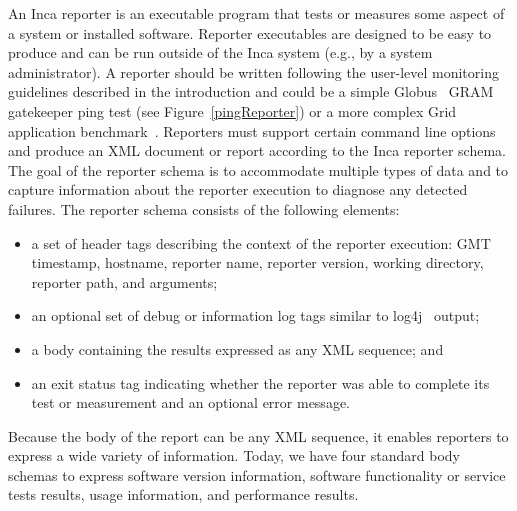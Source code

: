 \documentclass[times,10pt,twocolumn]{article}
\begin{document}
An Inca reporter is an executable program that tests or measures some aspect
of a system or installed software.   Reporter executables are designed to be
easy to produce and can be run outside of the Inca system (e.g., by a system
administrator).  A reporter should be written following the user-level
monitoring guidelines described in the introduction and could be a simple
Globus~\cite{globus} GRAM gatekeeper ping test (see Figure~\ref{pingReporter})
or a more complex Grid application benchmark~\cite{grasp}.  Reporters must
support certain command line options and produce an XML document or report
according to the Inca reporter schema.  The goal of the reporter schema is to
accommodate multiple types of data and to capture information about the
reporter execution to diagnose any detected failures.  The reporter schema
consists of the following elements: 

\begin{itemize}
\item a set of header tags describing the context of the reporter
execution:  GMT timestamp, hostname, reporter name, reporter version, working
directory, reporter path, and arguments;
\item an optional set of debug or information log tags similar to log4j~\cite{log4j} output;
\item a body containing the results expressed as any XML sequence; and
\item an exit status tag
indicating whether the reporter was able to complete its test or measurement
and an optional error message.  
\end{itemize} 
\noindent Because the body of the report can be any XML sequence, it enables
reporters to express a wide variety of information.  Today, we have four
standard body schemas to express software version information, software
functionality or service tests results, usage information, and performance
results.  
\end{document}
